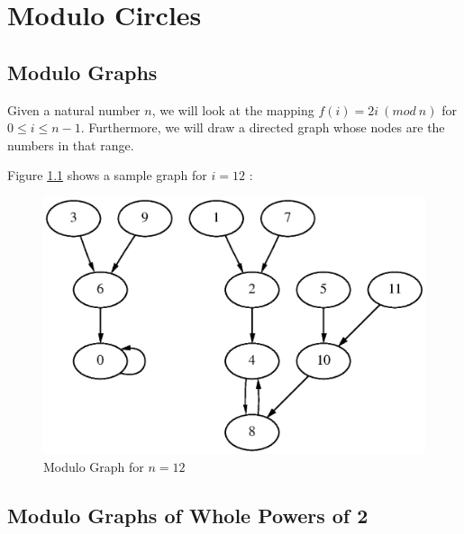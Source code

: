 \documentclass[a4paper]{report}
\begin{document}
\chapter{Modulo Circles}
\section{Modulo Graphs}

Given a natural number $ n $, we will look at the mapping
$ f(i) = 2i ~ (mod ~ n) $ for $ 0 \leq i \leq n-1 $. Furthermore, we
will draw a directed graph whose nodes are the numbers in that range.

Figure \ref{fig:graph-12-1} shows a sample graph for $ i = 12 $ :

\begin{figure}[ht]
\includegraphics{graph-12.eps}

\caption{\label{fig:graph-12-1} Modulo Graph for $ n = 12 $}
\end{figure}

\section{Modulo Graphs of Whole Powers of 2}
\end{document}
